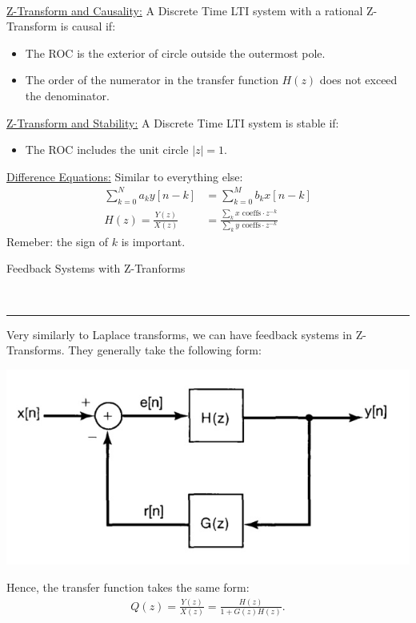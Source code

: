 \documentclass{article}
\newcommand{\sheader}[1]{\underline{#1:}}
\newcommand{\header}[1]{\begin{large}\noindent #1\end{large}\\\rule{\textwidth}{0.5pt}}
\newcommand{\gap}{\medskip\\}
\begin{document}
\gap
\sheader{Z-Transform and Causality} A Discrete Time LTI system with a rational Z-Transform 
is causal if:
\begin{itemize}
    \item The ROC is the exterior of circle outside the outermost pole.
    \item The order of the numerator in the transfer function $H(z)$ does not exceed the denominator.
\end{itemize}
\sheader{Z-Transform and Stability} A Discrete Time LTI system is stable if:
\begin{itemize}
    \item The ROC includes the unit circle $|z| = 1$.
\end{itemize}
\sheader{Difference Equations}
Similar to everything else:
\begin{align*}
    \sum_{k = 0}^N a_k y[n-k] &= \sum_{k = 0}^M b_k x[n -k]\\
    H(z) = \frac{Y(z)}{X(z)} &= \frac{\sum_k x \textrm{ coeffs} \cdot z^{-k}}{\sum_k y \textrm{ coeffs} \cdot z^{-k}}
\end{align*}
Remeber: the sign of $k$ is important.
\gap
\header{Feedback Systems with Z-Tranforms}
Very similarly to Laplace transforms, we can have feedback systems in Z-Transforms. 
They generally take the following form:\\
\begin{center}
    \includegraphics[scale=0.35]{z-feedback.jpg}
\end{center}
Hence, the transfer function takes the same form:
\begin{align*}
    Q(z) = \frac{Y(z)}{X(z)} = \frac{H(z)}{1 + G(z)H(z)}.
\end{align*}
\end{document}

